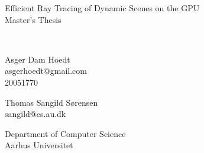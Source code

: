\documentclass[a4paper,english]{report}
\begin{document}
\begin{titlepage}

\thispagestyle{empty}
\centering
    { \baselineskip=24pt
      \vspace*{80pt}
              {\LARGE Efficient Ray Tracing of Dynamic Scenes on the
                GPU} \\
              Master's Thesis
              \vspace*{20pt}
              \\
              \vspace*{40pt}
              \\
              \begin{minipage}{0.4\textwidth}
                \centering
                Asger Dam Hoedt \\ asgerhoedt@gmail.com \\ 20051770
              \end{minipage}
              \begin{minipage}{0.4\textwidth}
                \centering
                Thomas Sangild Sørensen \\ sangild@cs.au.dk
              \end{minipage}
    }
    \vfill
    \small
    Department of Computer Science\\
    Aarhus Universitet
\end{titlepage}

\clearpage{}



\tableofcontents

\clearpage{}








\end{document}
